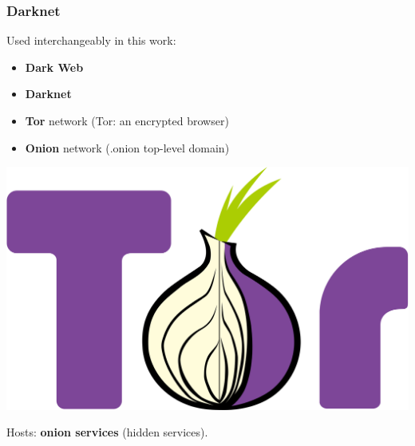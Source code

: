 \documentclass[t,xcolor={svgnames,table},aspectratio=169]{beamer}
\begin{document}
{%
\begin{frame}
\end{frame}
}

\begin{frame}
	\frametitle{Darknet}
	\Large
	Used interchangeably in this work:
	\vfill
	
	\begin{minipage}{.6\pagewidth}
	\begin{itemize}\setlength\itemsep{1em}
	\item \textbf{Dark Web}
	\item \textbf{Darknet}
	\item \textbf{Tor} network (Tor: an encrypted browser)
	\item \textbf{Onion} network (.onion top-level domain)
	\end{itemize}
	\end{minipage}
	\begin{minipage}{.3\pagewidth}
	\includegraphics[width=.3\pagewidth]{Tor.png}
	\end{minipage}
	\vfill
	
	Hosts: \textbf{onion services} (hidden services).
\end{frame}
\end{document}
